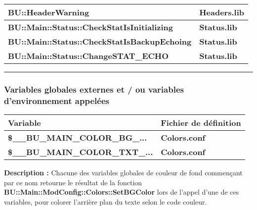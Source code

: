 \documentclass[a4paper,10pt]{article}
\begin{document}
\begin{justify}
\begin{tabular}{|l|l|}
        \hline
        \textbf{\color{func}BU::HeaderWarning}                             & \textbf{\color{path}Headers.lib}\\
        \hline
        \textbf{\color{func}BU::Main::Status::CheckStatIsInitializing}     & \textbf{\color{path}Status.lib}\\
        \hline
        \textbf{\color{func}BU::Main::Status::CheckStatIsBackupEchoing}    & \textbf{\color{path}Status.lib}\\
        \hline
        \textbf{\color{func}BU::Main::Status::ChangeSTAT\_ECHO}            & \textbf{\color{path}Status.lib}\\
        \hline
    \end{tabular}
\end{justify}

\setlength{\parskip}{2em}


\color{sec3}\par\noindent\rule{\textwidth}{0.4pt}\color{text}\setlength{\parskip}{1em}

\color{sec3}
\subsubsection{Variables globales externes et / ou variables d'environnement appelées}\color{text}

\begin{justify}
    \begin{tabular}{|l|l|}
        \hline
        \textbf{Variable} & \textbf{Fichier de définition}\\
        \hline
        \textbf{\color{vars}\$\_\_BU\_MAIN\_COLOR\_BG\_...} & \textbf{\color{path}Colors.conf}\\
        \hline
        \textbf{\color{vars}\$\_\_BU\_MAIN\_COLOR\_TXT\_...} & \textbf{\color{path}Colors.conf}\\
        \hline
    \end{tabular}

\end{justify}


\begin{justify}
    \textbf{Description :} Chacune des variables globales de couleur de fond commençant par ce nom retourne le résultat de la fonction \textbf{\color{func}BU::Main::ModConfig::Colors::SetBGColor} lors de l'appel d'une de ces variables, pour colorer l'arrière plan du texte selon le code couleur.
\end{justify}
\end{document}
